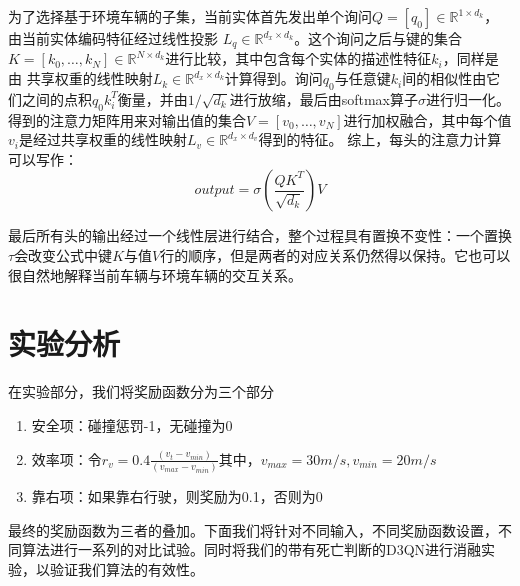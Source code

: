 \documentclass[letterpaper, 10 pt, conference]{ieeeconf}  %
\begin{document}
  为了选择基于环境车辆的子集，当前实体首先发出单个询问$Q=[q_0]\in \mathbb{R} ^{1\times d_k}$，由当前实体编码特征经过线性投影
$L_q\in\mathbb{R} ^{d_x\times d_k}$。这个询问之后与键的集合$K=[k_0,\ldots,k_N]\in\mathbb{R} ^{N\times d_k}$进行比较，其中包含每个实体的描述性特征$k_i$，同样是由
共享权重的线性映射$L_k\in\mathbb{R} ^{d_x\times d_k}$计算得到。询问$q_0$与任意键$k_i$间的相似性由它们之间的点积$q_0k_i^T$衡量，并由$1/\sqrt{d_k}$进行放缩，最后由softmax算子$\sigma $进行归一化。
得到的注意力矩阵用来对输出值的集合$V=[v_0,\ldots,v_N]$进行加权融合，其中每个值$v_i$是经过共享权重的线性映射$L_v\in\mathbb{R} ^{d_x\times d_v }$得到的特征。
综上，每头的注意力计算可以写作：
\begin{equation}
    output=\sigma\left(\frac{QK^T}{\sqrt{d_k}}\right)V
    \label{con:output}
\end{equation}

最后所有头的输出经过一个线性层进行结合，整个过程具有置换不变性：一个置换$\tau$会改变公式中键$K$与值$V$行的顺序，但是两者的对应关系仍然得以保持。它也可以很自然地解释当前车辆与环境车辆的交互关系。
\section{实验分析}
在实验部分，我们将奖励函数分为三个部分
\begin{enumerate}
    \item 安全项：碰撞惩罚-1，无碰撞为0
    \item 效率项：令$r_v = 0.4\frac{(v_t-v_{min})}{(v_{max}-v_{min})}$其中，$v_{max} = 30m/s,v_{min}=20m/s$
    \item 靠右项：如果靠右行驶，则奖励为0.1，否则为0
\end{enumerate}

最终的奖励函数为三者的叠加。下面我们将针对不同输入，不同奖励函数设置，不同算法进行一系列的对比试验。同时将我们的带有死亡判断的D3QN进行消融实验，以验证我们算法的有效性。
\end{document}
